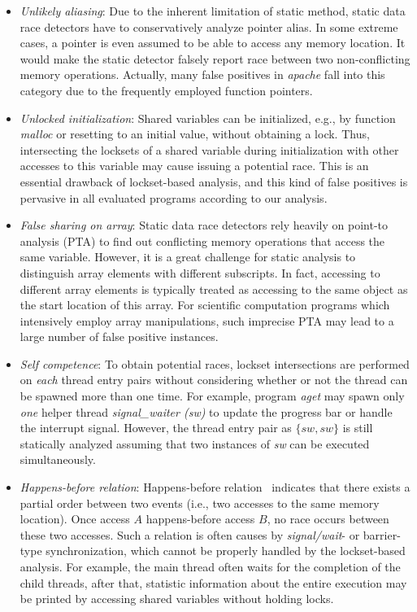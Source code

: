 \documentclass[10pt,onecolumn,letterpaper]{article}
\begin{document}
\begin{itemize}
\item \emph{Unlikely aliasing}: Due to the inherent limitation of static method,
static data race detectors have to conservatively analyze pointer
alias. In some extreme cases, a pointer is even assumed to be able
to access any memory location. It would make the static detector
falsely report race between two non-conflicting memory operations.
Actually, many false positives in \emph{apache} fall into this
category due to the frequently employed function pointers.
\item \emph{Unlocked initialization}: Shared variables can be initialized,
e.g., by function \emph{malloc} or resetting to an initial value,
without obtaining a lock. Thus, intersecting the locksets of a
shared variable during initialization with other accesses to this
variable may cause issuing a potential race. This is an essential
drawback of lockset-based analysis, and this kind of false positives
is pervasive in all evaluated programs according to our analysis.
\item \emph{False sharing on array}: Static data race detectors rely heavily on
point-to analysis (PTA) to find out conflicting memory operations
that access the same variable. However, it is a great challenge for
static analysis to distinguish array elements with different
subscripts. In fact, accessing to different array elements is
typically treated as accessing to the same object as the start
location of this array. For scientific computation programs which
intensively employ array manipulations, such imprecise PTA may lead
to a large number of false positive instances.
\item \emph{Self competence}: To obtain potential races, lockset intersections
are performed on \emph{each} thread entry pairs without considering
whether or not the thread can be spawned more than one time. For
example, program \emph{aget} may spawn only \emph{one} helper thread
\emph{signal\_waiter (sw)} to update the progress bar or handle the
interrupt signal. However, the thread entry pair as $\{sw, sw\}$ is
still statically analyzed assuming that two instances of \emph{sw}
can be executed simultaneously.
\item \emph{Happens-before relation}: Happens-before relation~\cite{Lamport78CACM} indicates that there
exists a partial order between two events (i.e., two accesses to the
same memory location). Once access $A$ happens-before access $B$, no
race occurs between these two accesses. Such a relation is often
causes by \emph{signal/wait}- or barrier-type synchronization, which
cannot be properly handled by the lockset-based analysis. For
example, the main thread often waits for the completion of the child
threads, after that, statistic information about the entire
execution may be printed by accessing shared variables without
holding locks.
\end{itemize}
\end{document}
